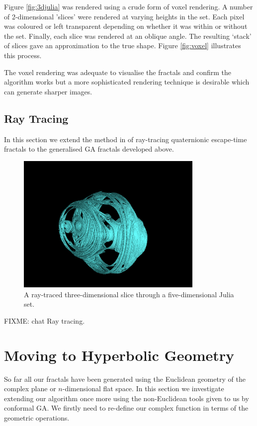 Figure \ref{fig:3djulia} was rendered using a crude form of voxel rendering. A
number of 2-dimensional 'slices' were rendered at varying heights in the set. Each
pixel was coloured or left transparent depending on whether it was within or without
the set. Finally, each slice was rendered at an oblique angle. The resulting
`stack' of slices gave an approximation to the true shape. Figure
\ref{fig:voxel} illustrates this process.

The voxel rendering was adequate to visualise the fractals and confirm the algorithm
works but a more sophisticated rendering technique is desirable which can generate
sharper images.

\subsection{Ray Tracing}

In this section we extend the method in \cite{FRAC:HypercomplexIterations} of 
ray-tracing quaternionic escape-time fractals to the generalised GA fractals developed 
above.


\begin{figure}
\centering
\includegraphics[width=0.8\textwidth]{5djulia}
\caption{\label{fig:5djulia}
  A ray-traced three-dimensional slice through a five-dimensional Julia set.
}
\end{figure}

FIXME: chat Ray tracing.

\section{Moving to Hyperbolic Geometry}

So far all our fractals have been generated using the Euclidean geometry of
the complex plane or $n$-dimensional flat space. In this section we
investigate extending our algorithm once more using the non-Euclidean tools
given to us by conformal GA. We firstly need to re-define our complex function
in terms of the geometric operations.


